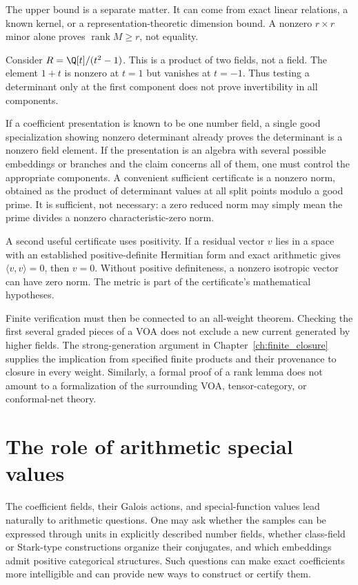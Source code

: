 The upper bound is a separate matter.  It can come from exact
linear relations, a known kernel, or a representation-theoretic
dimension bound.  A nonzero $r\times r$ minor alone proves
$\operatorname{rank}M\geq r$, not equality.

\begin{example}
Consider $R=\Q[t]/(t^2-1)$.  This is a product of two fields,
not a field.  The element $1+t$ is nonzero at $t=1$ but vanishes
at $t=-1$.  Thus testing a determinant only at the first component
does not prove invertibility in all components.

If a coefficient presentation is known to be one number field,
a single good specialization showing nonzero determinant already
proves the determinant is a nonzero field element.  If the
presentation is an algebra with several possible embeddings or
branches and the claim concerns all of them, one must control the
appropriate components.  A convenient sufficient certificate is a
nonzero norm, obtained as the product of determinant values at all
split points modulo a good prime.  It is sufficient, not necessary:
a zero reduced norm may simply mean the prime divides a nonzero
characteristic-zero norm.
\end{example}

A second useful certificate uses positivity.  If a residual vector
$v$ lies in a space with an established positive-definite Hermitian
form and exact arithmetic gives $\langle v,v\rangle=0$, then
$v=0$.  Without positive definiteness, a nonzero isotropic vector
can have zero norm.  The metric is part of the certificate's
mathematical hypotheses.

Finite verification must then be connected to an all-weight theorem.
Checking the first several graded pieces of a VOA does not exclude
a new current generated by higher fields.  The strong-generation
argument in Chapter~\ref{ch:finite_closure} supplies the implication from
specified finite products and their provenance to closure in every
weight.  Similarly, a formal proof of a rank lemma does not amount
to a formalization of the surrounding VOA, tensor-category, or
conformal-net theory.

\section{The role of arithmetic special values}

The coefficient fields, their Galois actions, and special-function
values lead naturally to arithmetic questions.  One may ask whether
the samples can be expressed through units in explicitly described
number fields, whether class-field or Stark-type constructions
organize their conjugates, and which embeddings admit positive
categorical structures.  Such questions can make exact coefficients
more intelligible and can provide new ways to construct or certify
them.

